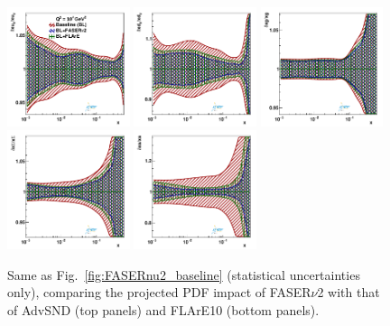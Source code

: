\begin{figure}[htbp]
\includegraphics[width=0.32\textwidth]{plots/proton_fasernu2/FASERv2_vs_FLArE10/statOnly_FLArE10_q2_10000_pdf_uv_ratio.pdf}
\includegraphics[width=0.32\textwidth]{plots/proton_fasernu2/FASERv2_vs_FLArE10/statOnly_FLArE10_q2_10000_pdf_dv_ratio.pdf}
\includegraphics[width=0.32\textwidth]{plots/proton_fasernu2/FASERv2_vs_FLArE10/statOnly_FLArE10_q2_10000_pdf_g_ratio.pdf}\\
\includegraphics[width=0.32\textwidth]{plots/proton_fasernu2/FASERv2_vs_FLArE10/statOnly_FLArE10_q2_10000_pdf_Sea_ratio.pdf}
\includegraphics[width=0.32\textwidth]{plots/proton_fasernu2/FASERv2_vs_FLArE10/statOnly_FLArE10_q2_10000_pdf_s_ratio.pdf}
\caption{
  Same as Fig.~\ref{fig:FASERnu2_baseline} (statistical uncertainties only),
  comparing
  the projected PDF impact of FASER$\nu$2 with that of  AdvSND (top panels) and FLArE10 (bottom panels). 
}
\label{fig:FASERnu2_FLAre10}
\end{figure}

